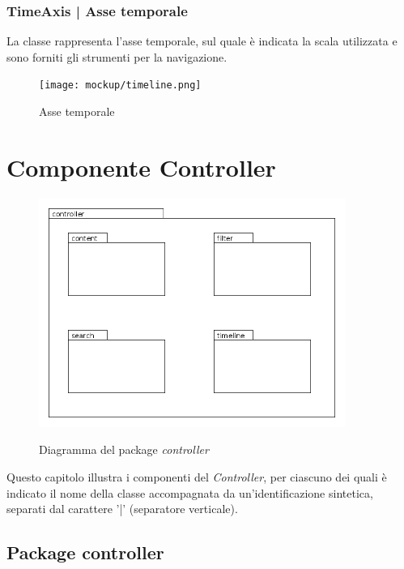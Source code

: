 \documentclass[10pt,a4paper,headinclude,footinclude,hidelinks]{scrreprt} %
\begin{document}
	\subsection[TimeAxis]{TimeAxis | Asse temporale}
	\label{sec:stage:design:view.timeline:time-axis}
	La classe \textit{} rappresenta l'asse temporale, sul quale è indicata la scala utilizzata e sono forniti gli strumenti per la navigazione.

	\begin{figure}[ht]
		\begin{center}
	    	\texttt{[image: mockup/timeline.png]}
			\label{gfx:mockup:timeline:axis}
			\caption{Asse temporale}
		\end{center}
	\end{figure}

	\chapter{Componente Controller}
	\label{ch:stage:design:controller}

	\begin{figure}[ht]
		\begin{center}
	    	\includegraphics[width=10cm]{package/controller.png}
			\label{gfx:package:controller}
			\caption{Diagramma del package \textit{controller}}
		\end{center}
	\end{figure}

	Questo capitolo illustra i componenti del \textit{Controller}, per ciascuno dei quali è indicato il nome della classe accompagnata da un'identificazione sintetica, separati dal carattere '|' (separatore verticale).

	\section{Package controller}
	\label{sec:stage:design:controller}
\end{document}
